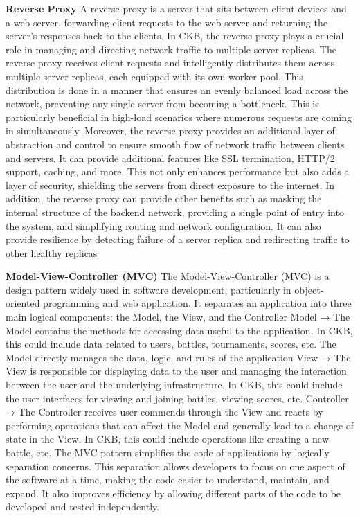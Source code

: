 \textbf{Reverse Proxy}\newline
A reverse proxy is a server that sits between client devices and a web server, forwarding client requests to the web server and returning the server’s 
responses back to the clients. In CKB, the reverse proxy plays a crucial role in managing and directing network traffic to multiple server replicas. 
The reverse proxy receives client requests and intelligently distributes them across multiple server replicas, each equipped with its own worker pool. 
This distribution is done in a manner that ensures an evenly balanced load across the network, preventing any single server from becoming a bottleneck. 
This is particularly beneficial in high-load scenarios where numerous requests are coming in simultaneously.\newline
Moreover, the reverse proxy provides an additional layer of abstraction and control to ensure smooth flow of network traffic between clients and servers. 
It can provide additional features like SSL termination, HTTP/2 support, caching, and more. This not only enhances performance but also adds a layer of security, 
shielding the servers from direct exposure to the internet.\newline
In addition, the reverse proxy can provide other benefits such as masking the internal structure of the backend network, providing a single point of entry into the system, 
and simplifying routing and network configuration. It can also provide resilience by detecting failure of a server replica and redirecting traffic to other healthy replicas


\textbf{Model-View-Controller (MVC)}\newline
The Model-View-Controller (MVC) is a design pattern widely used in software development, particularly in object-oriented programming and web application. 
It separates an application into three main logical components: the Model, the View, and the Controller\newline
Model → The Model contains the methods for accessing data useful to the application. 
In CKB, this could include data related to users, battles, tournaments, scores, etc. The Model directly manages the data, logic, and rules of the application\newline
View → The View is responsible for displaying data to the user and managing the interaction between the user and the underlying infrastructure. 
In CKB, this could include the user interfaces for viewing and joining battles, viewing scores, etc.\newline
Controller → The Controller receives user commends through the View and reacts by performing operations that can affect the Model and 
generally lead to a change of state in the View. In CKB, this could include operations like creating a new battle, etc.\newline
The MVC pattern simplifies the code of applications by logically separation concerns. 
This separation allows developers to focus on one aspect of the software at a time, making the code easier to understand, maintain, and expand. 
It also improves efficiency by allowing different parts of the code to be developed and tested independently.

